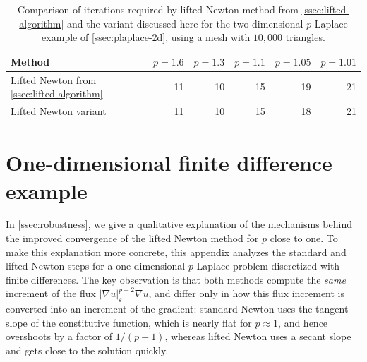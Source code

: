 \documentclass[11pt,pdflatex,sn-mathphys-num]{sn-jnl}
\theoremstyle{thmstyleone}%
\theoremstyle{thmstyletwo}%
\theoremstyle{thmstylethree}%
\begin{document}
\begin{table}[ht]
    \centering
    \caption{Comparison of iterations required by lifted Newton method from \cref{ssec:lifted-algorithm} and the variant discussed here for the two-dimensional $p$-Laplace example of \cref{ssec:plaplace-2d}, using a mesh with $10{,}000$ triangles.}  \label{tab:p-Lapl-2d-appendix}
    \begin{tabular}{lrrrrr}
        \toprule
        Method & $p=1.6$ & $p=1.3$ & $p=1.1$ & $p=1.05$ & $p=1.01$ \\
        \midrule
        Lifted Newton from \cref{ssec:lifted-algorithm} & 11 & 10 & 15 & 19 & 21 \\
        Lifted Newton variant & 11 & 10 & 15 & 18 & 21 \\
        \bottomrule
    \end{tabular}
\end{table}




















\section{One-dimensional finite difference example}
\label{app:one_dim_flux}



In \cref{ssec:robustness}, we give a qualitative explanation of the mechanisms behind the improved convergence of the lifted Newton method for $p$ close to one. To make this explanation more concrete, this appendix analyzes the standard and lifted Newton steps for a one-dimensional $p$-Laplace problem discretized with finite differences. The key observation is that both methods compute the \emph{same} increment of the flux $|\nabla u|_{\varepsilon}^{p-2}\nabla u$, and differ only in how this flux increment is converted into an increment of the gradient: standard Newton uses the tangent slope of the constitutive function, which is nearly flat for $p\approx 1$, and hence overshoots by a factor of $1/(p-1)$, whereas lifted Newton uses a secant slope and gets close to the solution quickly.
\end{document}
